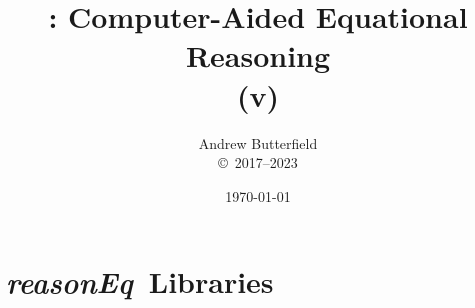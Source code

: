 \documentclass[fleqn,10pt]{report}
\author{
Andrew Butterfield
\\
{\small \copyright\ 2017--2023}
}
\title{
  \reasonEq: Computer-Aided Equational Reasoning
  \\(v\reqVersion)
}
\date{
\today
}
\def\reasonEq{\textit{\textsf{reasonEq}}}
\begin{document}
\maketitle
\tableofcontents


\chapter{\reasonEq\ Libraries}

\newpage
\newpage

% 



%
%
\end{document}
